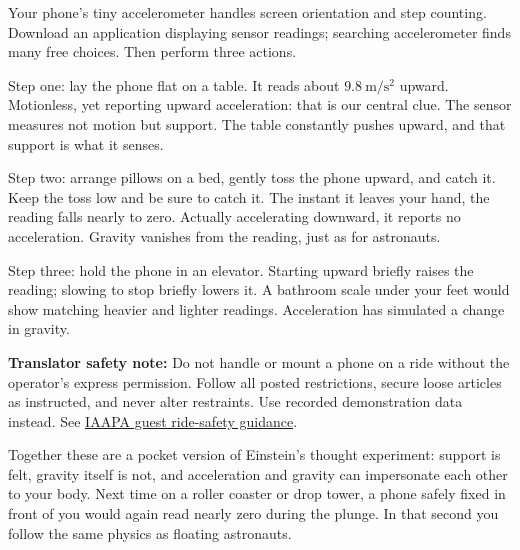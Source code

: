 \begin{experiment}
Your phone's tiny accelerometer handles screen orientation and step counting. Download an application displaying sensor readings; searching accelerometer finds many free choices. Then perform three actions.

Step one: lay the phone flat on a table. It reads about \(9.8\ \mathrm{m/s^{2}}\) upward. Motionless, yet reporting upward acceleration: that is our central clue. The sensor measures not motion but support. The table constantly pushes upward, and that support is what it senses.

Step two: arrange pillows on a bed, gently toss the phone upward, and catch it. Keep the toss low and be sure to catch it. The instant it leaves your hand, the reading falls nearly to zero. Actually accelerating downward, it reports no acceleration. Gravity vanishes from the reading, just as for astronauts.

Step three: hold the phone in an elevator. Starting upward briefly raises the reading; slowing to stop briefly lowers it. A bathroom scale under your feet would show matching heavier and lighter readings. Acceleration has simulated a change in gravity.

\textbf{Translator safety note:} Do not handle or mount a phone on a ride without the operator's express permission. Follow all posted restrictions, secure loose articles as instructed, and never alter restraints. Use recorded demonstration data instead. See \href{https://iaapa.org/safety-security/ride-safety-report}{IAAPA guest ride-safety guidance}.

Together these are a pocket version of Einstein's thought experiment: support is felt, gravity itself is not, and acceleration and gravity can impersonate each other to your body. Next time on a roller coaster or drop tower, a phone safely fixed in front of you would again read nearly zero during the plunge. In that second you follow the same physics as floating astronauts.
\end{experiment}


